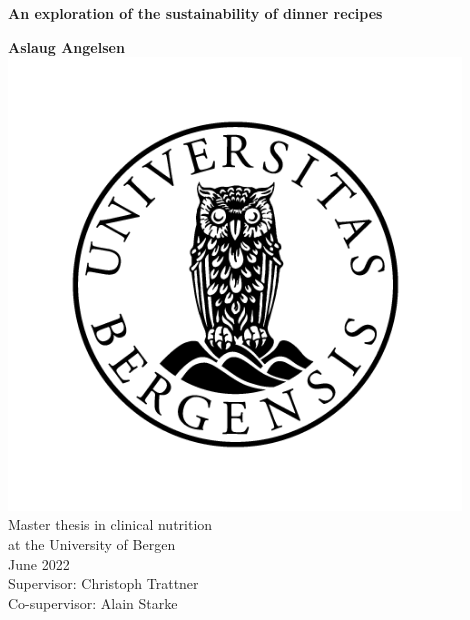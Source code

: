 \thispagestyle{empty}

\begin{titlepage}

\begin{center}

\vspace*{2em}
        \fontsize{25}{24}
        \textbf{An exploration of the sustainability of dinner recipes}
        
        \vspace{0.5cm}
        \large\textbf{Aslaug Angelsen}
        \vspace{0.5cm}\\
		    \includegraphics[width=120mm]{images/emblem}
		    \vspace{0.5cm}\\
		    Master thesis in clinical nutrition\\
		    at the University of Bergen\\
		    June 2022\\
		    \vspace{1.5cm}
		    Supervisor: Christoph Trattner\\
		    Co-supervisor: Alain Starke\\
		    \vspace{0.5cm}
      	\huge\date{2022}
      	
\end{center}
\end{titlepage}
\afterpage{\blankpage}


